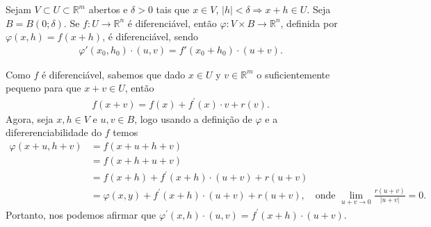\begin{homeworkProblem}
  Sejam $V \subset U \subset \mathbb{R}^m$ abertos e $\delta > 0$ tais que $x \in V$, $|h|<\delta \Rightarrow x+h \in U$. Seja $B = B(0;\delta)$. Se $f : U \to \mathbb{R}^n$ é diferenciável, então $\varphi : V \times B \to \mathbb{R}^n$, definida por $\varphi(x,h)=f(x+h)$, é diferenciável, sendo
  \begin{align*}
    \varphi'(x_0,h_0)\cdot (u,v) = f'(x_0+h_0)\cdot (u+v).   
  \end{align*}
  \begin{solution}
    Como $f$ é diferenciável, sabemos que dado $x\in U$ y $v\in \mathbb{R}^{m}$ o suficientemente pequeno para que $x+v\in U$, então
    \begin{align*}
      f(x+v)=f(x)+f^{\prime}(x)\cdot v+r(v).
    \end{align*}
    Agora, seja $x,h\in V$ e $u,v\in B$, logo usando a definição de $\varphi$ e a difererenciabilidade do $f$ temos 
    \begin{align*}
      \varphi(x+u,h+v)&=f(x+u+h+v)\\
      &=f(x+h+u+v)\\
      &=f(x+h)+f^{\prime}(x+h)\cdot(u+v)+r(u+v)\\
      &=\varphi(x,y)+f^{\prime}(x+h)\cdot (u+v)+r(u+v),\quad\text{onde }\lim_{u+v \to 0}\frac{r(u+v)}{|u+v|}=0.
    \end{align*}
    Portanto, nos podemos afirmar que $\varphi^{\prime}(x,h)\cdot(u,v)=f^{\prime}(x+h)\cdot(u+v)$.
  \end{solution}
\end{homeworkProblem}
